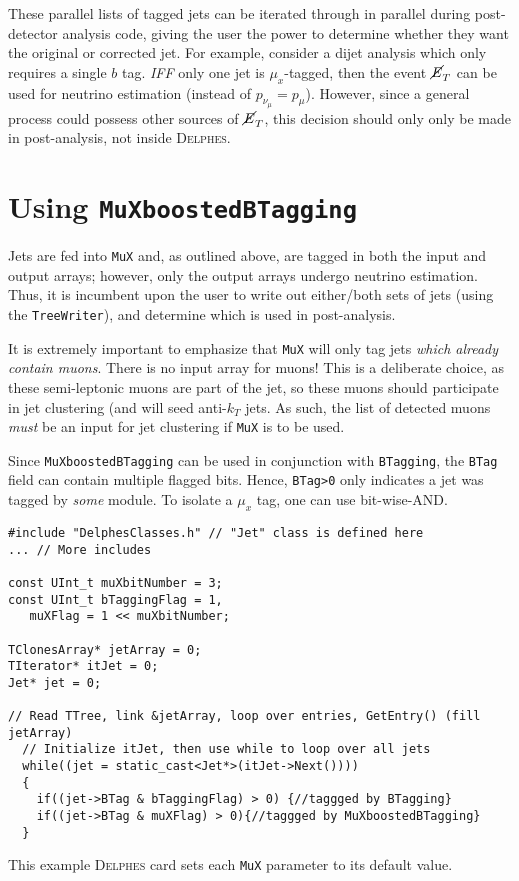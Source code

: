 \documentclass[10pt]{article}
\newcommand{\muX}{$\mu_{x}^{}$}
\newcommand{\muXmodFull}{\texttt{MuXboostedBTagging}}
\newcommand{\muXmod}{\texttt{MuX}}
\newcommand{\delphes}{\textsc{Delphes}}
\newcommand{\MET}{\cancel{E}_{T}^{}}
\newcommand{\pMu}[1][]     {p_{\mu}^{#1}}
\newcommand{\pNu}[1][]     {p_{\nu_{\mu}}^{#1}}
\begin{document}
These parallel lists of tagged jets can be iterated through in parallel during
post-detector analysis code, giving the user the power to determine whether 
they want the original or corrected jet. For example, consider a dijet analysis 
which only requires a single $b$ tag. \emph{IFF} only one jet is {\muX}-tagged, then 
the event $\MET$ can be used for neutrino estimation (instead of $\pNu=\pMu$).
However, since a general process could possess other sources of $\MET$, this
decision should only only be made in post-analysis, not inside {\delphes}.

\section{Using {\muXmodFull}}

Jets are fed into {\muXmod} and, as outlined above, are tagged in both
the input and output arrays; however, only the output arrays undergo neutrino
estimation. Thus, it is incumbent upon the user to write out either/both
sets of jets (using the \texttt{TreeWriter}), and determine which is used in
post-analysis.

It is extremely important to emphasize that {\muXmod} will only tag jets
\emph{which already contain muons}. There is no input array for muons! This is
a deliberate choice, as these semi-leptonic muons are part of the jet, so 
these muons should participate in jet clustering (and will seed anti-$k_T$ jets.
As such, the list of detected muons \emph{must} be an input for jet clustering
if {\muXmod} is to be used.

Since {\muXmodFull} can be used in conjunction with \texttt{BTagging}, the
\texttt{BTag} field can contain multiple flagged bits. Hence, \texttt{BTag>0}
only indicates a jet was tagged by \emph{some} module. To isolate a {\muX} tag,
one can use bit-wise-AND.

\begin{lstlisting}
#include "DelphesClasses.h" // "Jet" class is defined here
... // More includes

const UInt_t muXbitNumber = 3;
const UInt_t bTaggingFlag = 1,
   muXFlag = 1 << muXbitNumber;

TClonesArray* jetArray = 0;
TIterator* itJet = 0;
Jet* jet = 0;

// Read TTree, link &jetArray, loop over entries, GetEntry() (fill jetArray)
  // Initialize itJet, then use while to loop over all jets 
  while((jet = static_cast<Jet*>(itJet->Next())))
  {
    if((jet->BTag & bTaggingFlag) > 0) {//taggged by BTagging}
    if((jet->BTag & muXFlag) > 0){//taggged by MuXboostedBTagging}
  }
\end{lstlisting}
%
This example {\delphes} card sets each {\muXmod} parameter to its default
value.
%
\end{document}
